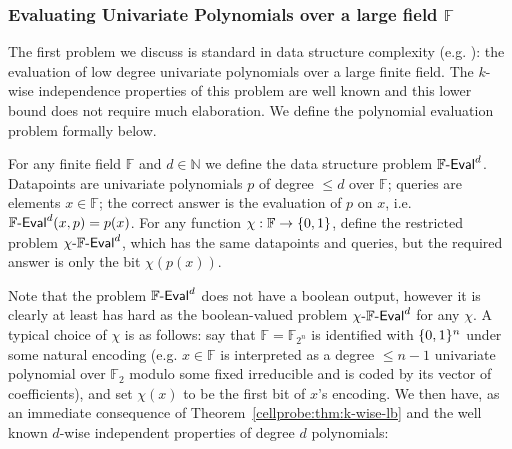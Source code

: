 \subsubsection{Evaluating Univariate Polynomials over a large field $\mathbb{F}$}
The first problem we discuss is standard in data structure complexity (e.g. \cite{kasper,golovnev}): the evaluation of low degree univariate polynomials over a large finite field. The $k$-wise independence properties of this problem are well known and this lower bound does not require much elaboration. 
We define the polynomial evaluation problem formally below.
\begin{definition}
For any finite field $\mathbb{F}$ and $d\in \mathbb{N}$ we define the data structure problem $\mathbb{F}\text{-}\mathsf{Eval}^d$. Datapoints are univariate polynomials $p$ of degree $\leq d$ over $\mathbb{F}$; queries are elements $x \in \mathbb{F}$; the correct answer is the evaluation of $p$ on $x$, i.e. $\mathbb{F}\text{-}\mathsf{Eval}^d(x,p) = p(x)$.
For any function $\chi: \mathbb{F} \to \{0,1\}$, define the restricted problem $\chi\text{-}\mathbb{F}\text{-}\mathsf{Eval}^d$, which has the same datapoints and queries, but the required answer is only the bit $\chi(p(x))$. 
\end{definition}
Note that the problem $\mathbb{F}\text{-}\mathsf{Eval}^d$ does not have a boolean output, however it is clearly at least has hard as the boolean-valued problem $\chi\text{-}\mathbb{F}\text{-}\mathsf{Eval}^d$ for any $\chi$. A typical choice of $\chi$ is as follows: say that $\mathbb{F}=\mathbb{F}_{2^n}$ is identified with $\{0,1\}^n$ under some natural encoding (e.g. $x \in \mathbb{F}$ is interpreted as a degree $\leq n-1$ univariate polynomial over $\mathbb{F}_2$ modulo some fixed irreducible and is coded by its vector of coefficients), and set $\chi(x)$ to be the first bit of $x$'s encoding.
We then have, as an immediate consequence of Theorem~\ref{cellprobe:thm:k-wise-lb} and the well known $d$-wise independent properties of degree $d$ polynomials:
